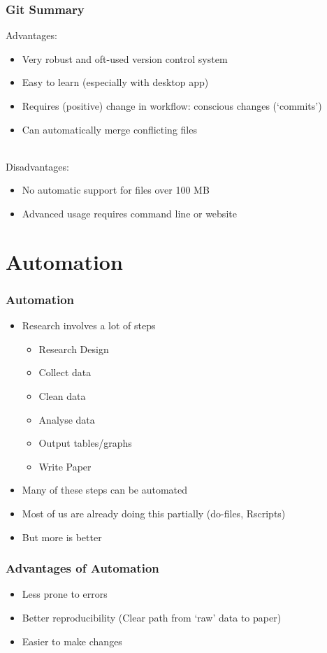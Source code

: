 \documentclass{beamer}
\begin{document}
\begin{frame}[t]\frametitle{Git Summary}
	Advantages:
	\begin{itemize}
		\item Very robust and oft-used version control system
		\item Easy to learn (especially with desktop app)
		\item Requires (positive) change in workflow: conscious changes (`commits') 
		\item Can automatically merge conflicting files \\~\\
	\end{itemize}
    Disadvantages:
    \begin{itemize}
    	\item No automatic support for files over 100 MB
    	\item Advanced usage requires command line or website
    \end{itemize}
\end{frame}

\section{Automation}

\begin{frame}[t]\frametitle{Automation}
	\begin{itemize}
		\item Research involves a lot of steps
		\begin{itemize}
			\item Research Design
			\item Collect data
			\item Clean data
			\item Analyse data
			\item Output tables/graphs
			\item Write Paper
 		\end{itemize}
 		\item Many of these steps can be automated
 		\item Most of us are already doing this partially (do-files, Rscripts)
 		\item But more is better
	\end{itemize}
\end{frame}

\begin{frame}[t]\frametitle{Advantages of Automation}
	\begin{itemize}
		\item Less prone to errors
		\item Better reproducibility (Clear path from `raw' data to paper)
		\item Easier to make changes
	\end{itemize}
\end{frame}
\end{document}
